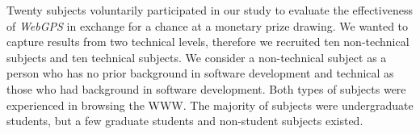 \documentclass[10pt,psfig]{article}
\begin{document}
{%

Twenty subjects voluntarily participated in our study to evaluate the effectiveness of {\em WebGPS} in exchange for a chance at a monetary prize drawing.
We wanted to capture results from two technical levels, therefore we recruited ten non-technical subjects and ten technical subjects.
We consider a non-technical subject as a person who has no prior background in software development and technical as those who had background in software development.
Both types of subjects were experienced in browsing the WWW.
The majority of subjects were undergraduate students, but a few graduate students and non-student subjects existed.


\begin{table}[t]
\label{table:assign1}
\end{table}

}
\end{document}

